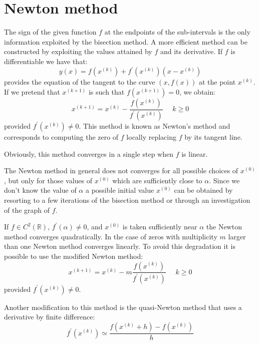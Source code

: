 \documentclass[12pt, a4paper]{report}
\newtheorem[style=M,bodystyle=\normalfont]{theorem}{Theorem}
\newtheorem[style=M,bodystyle=\normalfont]{corollary}{Corollary}
\newtheorem[style=M,bodystyle=\normalfont]{lemma}{Lemma}
\newtheorem[style=M,bodystyle=\normalfont]{definition}{Definition}
\begin{document}
    \section{Newton method}
    The sign of the given function $f$ at the endpoints of the sub-intervals is the only information exploited by the bisection method. A more efficient method can be constructed 
    by exploiting the values attained by $f$ and its derivative. If $f$ is differentiable we have that: 
    \[y(x)=f(x^{(k)})+f^{'}(x^{(k)})(x-x^{(k)})\]
    provides the equation of the tangent to the curve $(x,f(x))$ at the point $x^{(k)}$. If we pretend that $x^{(k+1)}$ is such that $f(x^{(k+1)})=0$, we obtain:
    \[x^{(k+1)}=x^{(k)}-\dfrac{f(x^{(k)})}{f^{'}(x^{(k)})} \:\:\:\:\:\: k \geq 0\]
    provided $f^{'}(x^{(k)}) \neq 0$. This method is known as Newton's method and corresponds to computing the zero of $f$ locally replacing $f$ by its tangent line. 

    Obviously, this method converges in a single step when $f$ is linear. 

    The Newton method in general does not converges for all possible choices of $x^{(0)}$, but only for those values of $x^{(0)}$ which are sufficiently close to $\alpha$. Since we 
    don't know the value of $\alpha$ a possible initial value $x^{(0)}$ can be obtained by resorting to a few iterations of the bisection method or through an investigation of the 
    graph of $f$. 

    If $f \in C^2(\mathbb{R})$, $f^{'}(\alpha) \neq 0$, and $x^{(0)}$ is taken sufficiently near $\alpha$ the Newton method converges quadratically. In the case of zeros with 
    multiplicity $m$ larger than one Newton method converges linearly. To avoid this degradation it is possible to use the modified Newton method:
    \[x^{(k+1)}=x^{(k)}-m\dfrac{f(x^{(k)})}{f^{'}(x^{(k)})} \:\:\:\:\:\: k \geq 0\]
    provided $f^{'}(x^{(k)}) \neq 0$.

    Another modification to this method is the quasi-Newton method that uses a derivative by finite difference: 
    \[f^{'}(x^{(k)}) \simeq \dfrac{f(x^{(k)}+h)-f(x^{(k)})}{h}\]
\end{document}
